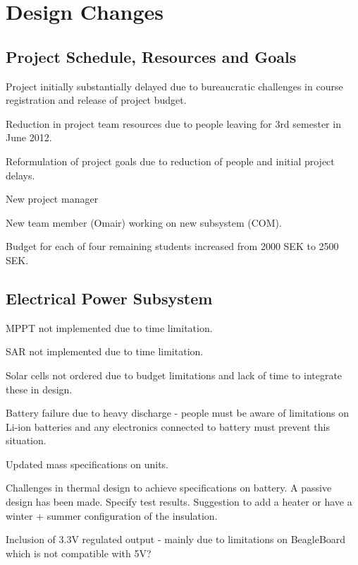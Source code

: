 \newpage
\chapter{Design Changes}
\label{chap:design_changes}


\section{Project Schedule, Resources and Goals}

Project initially substantially delayed due to bureaucratic challenges in course registration and release of project budget.

Reduction in project team resources due to people leaving for 3rd semester in June 2012. 

Reformulation of project goals due to reduction of people and initial project delays.

New project manager 

New team member (Omair) working on new subsystem (COM).

Budget for each of four remaining students increased from 2000 SEK to 2500 SEK.


\section{Electrical Power Subsystem}

MPPT not implemented due to time limitation.

SAR not implemented due to time limitation.

Solar cells not ordered due to budget limitations and lack of time to integrate these in design.

Battery failure due to heavy discharge - people must be aware of limitations on Li-ion batteries and any electronics connected to battery must prevent this situation.

Updated mass specifications on units.

Challenges in thermal design to achieve specifications on battery. A passive design has been made. Specify test results. Suggestion to add a heater or have a winter + summer configuration of the insulation.

Inclusion of 3.3V regulated output - mainly due to limitations on BeagleBoard which is not compatible with 5V?

